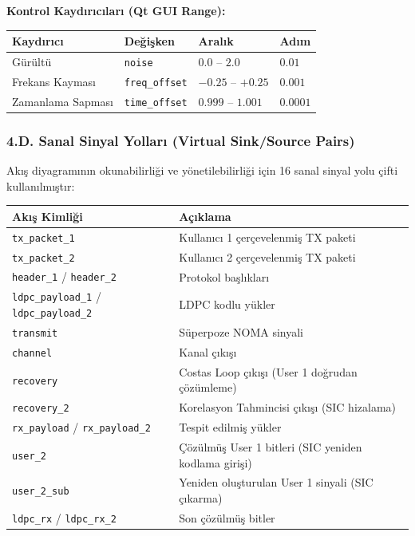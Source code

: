 \documentclass[
]{IEEEtran}
\newcounter{none} %
\begin{document}
\textbf{Kontrol Kaydırıcıları (Qt GUI Range):}

{\def\LTcaptype{none} %
\begin{longtable}[]{@{}llll@{}}
\toprule\noalign{}
Kaydırıcı & Değişken & Aralık & Adım \\
\midrule\noalign{}
\endhead
\bottomrule\noalign{}
\endlastfoot
Gürültü & \texttt{noise} & \(0.0\) -- \(2.0\) & \(0.01\) \\
Frekans Kayması & \texttt{freq\_offset} & \(-0.25\) -- \(+0.25\) &
\(0.001\) \\
Zamanlama Sapması & \texttt{time\_offset} & \(0.999\) -- \(1.001\) &
\(0.0001\) \\
\end{longtable}
}

\subsubsection{4.D. Sanal Sinyal Yolları (Virtual Sink/Source
Pairs)}\label{d.-sanal-sinyal-yollarux131-virtual-sinksource-pairs}

Akış diyagramının okunabilirliği ve yönetilebilirliği için 16 sanal
sinyal yolu çifti kullanılmıştır:

{\def\LTcaptype{none} %
\begin{longtable}[]{@{}ll@{}}
\toprule\noalign{}
Akış Kimliği & Açıklama \\
\midrule\noalign{}
\endhead
\bottomrule\noalign{}
\endlastfoot
\texttt{tx\_packet\_1} & Kullanıcı 1 çerçevelenmiş TX paketi \\
\texttt{tx\_packet\_2} & Kullanıcı 2 çerçevelenmiş TX paketi \\
\texttt{header\_1} / \texttt{header\_2} & Protokol başlıkları \\
\texttt{ldpc\_payload\_1} / \texttt{ldpc\_payload\_2} & LDPC kodlu
yükler \\
\texttt{transmit} & Süperpoze NOMA sinyali \\
\texttt{channel} & Kanal çıkışı \\
\texttt{recovery} & Costas Loop çıkışı (User 1 doğrudan çözümleme) \\
\texttt{recovery\_2} & Korelasyon Tahmincisi çıkışı (SIC hizalama) \\
\texttt{rx\_payload} / \texttt{rx\_payload\_2} & Tespit edilmiş
yükler \\
\texttt{user\_2} & Çözülmüş User 1 bitleri (SIC yeniden kodlama
girişi) \\
\texttt{user\_2\_sub} & Yeniden oluşturulan User 1 sinyali (SIC
çıkarma) \\
\texttt{ldpc\_rx} / \texttt{ldpc\_rx\_2} & Son çözülmüş bitler \\
\end{longtable}
}
\end{document}
